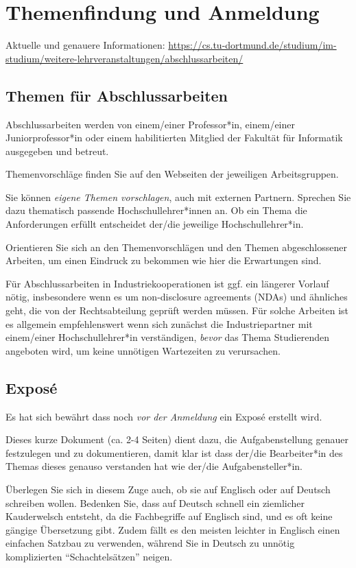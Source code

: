 \chapter{Themenfindung und Anmeldung}

Aktuelle und genauere Informationen:
\url{https://cs.tu-dortmund.de/studium/im-studium/weitere-lehrveranstaltungen/abschlussarbeiten/}

\section{Themen für Abschlussarbeiten}

Abschlussarbeiten werden von einem/einer Professor*in, einem/einer
Juniorprofessor*in oder einem habilitierten Mitglied der Fakultät für
Informatik ausgegeben und betreut.

Themenvorschläge finden Sie auf den Webseiten der jeweiligen Arbeitsgruppen.

Sie können \emph{eigene Themen vorschlagen}, auch mit externen Partnern.
Sprechen Sie dazu thematisch passende Hochschullehrer*innen an.
Ob ein Thema die Anforderungen erfüllt entscheidet der/die jeweilige Hochschullehrer*in.

Orientieren Sie sich an den Themenvorschlägen und den Themen abgeschlossener Arbeiten,
um einen Eindruck zu bekommen wie hier die Erwartungen sind.

Für Abschlussarbeiten in Industriekooperationen ist ggf.{} ein längerer Vorlauf nötig,
insbesondere wenn es um non-disclosure agreements (NDAs) und ähnliches geht,
die von der Rechtsabteilung geprüft werden müssen.
Für solche Arbeiten ist es allgemein empfehlenswert wenn sich zunächst die Industriepartner
mit einem/einer Hochschullehrer*in verständigen, \emph{bevor} das Thema Studierenden angeboten wird,
um keine unnötigen Wartezeiten zu verursachen.

\section{Exposé}

Es hat sich bewährt dass noch \emph{vor der Anmeldung} ein Exposé erstellt wird.

Dieses kurze Dokument (ca.{} 2-4 Seiten) dient dazu, die Aufgabenstellung
genauer festzulegen und zu dokumentieren, damit klar ist dass der/die Bearbeiter*in des Themas
dieses genauso verstanden hat wie der/die Aufgabensteller*in.

Überlegen Sie sich in diesem Zuge auch, ob sie auf Englisch oder auf Deutsch schreiben wollen.
Bedenken Sie, dass auf Deutsch schnell ein ziemlicher Kauderwelsch entsteht, da
die Fachbegriffe auf Englisch sind, und es oft keine gängige Übersetzung gibt.
Zudem fällt es den meisten leichter in Englisch einen einfachen Satzbau zu verwenden,
während Sie in Deutsch zu unnötig komplizierten \enquote{Schachtelsätzen} neigen.

